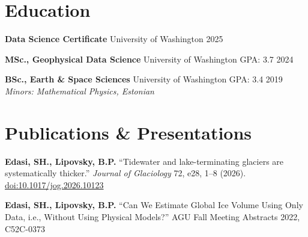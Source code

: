 \documentclass[11pt,a4paper]{article}
\begin{document}
\section*{Education}

\noindent
\textbf{Data Science Certificate} \hfill University of Washington \hfill 2025

\vspace{0.1cm}
\noindent
\textbf{MSc., Geophysical Data Science} \hfill University of Washington \hfill GPA: 3.7 \hfill 2024

\vspace{0.1cm}
\noindent
\textbf{BSc., Earth \& Space Sciences} \hfill University of Washington \hfill GPA: 3.4 \hfill 2019 \\
\textit{Minors: Mathematical Physics, Estonian}

\section*{Publications \& Presentations}

\noindent
\textbf{Edasi, SH., Lipovsky, B.P.} ``Tidewater and lake-terminating glaciers are systematically thicker.'' \textit{Journal of Glaciology} 72, e28, 1--8 (2026). \href{https://doi.org/10.1017/jog.2026.10123}{doi:10.1017/jog.2026.10123}

\noindent
\textbf{Edasi, SH., Lipovsky, B.P.} ``Can We Estimate Global Ice Volume Using Only Data, i.e., Without Using Physical Models?'' AGU Fall Meeting Abstracts 2022, C52C-0373
\end{document}
